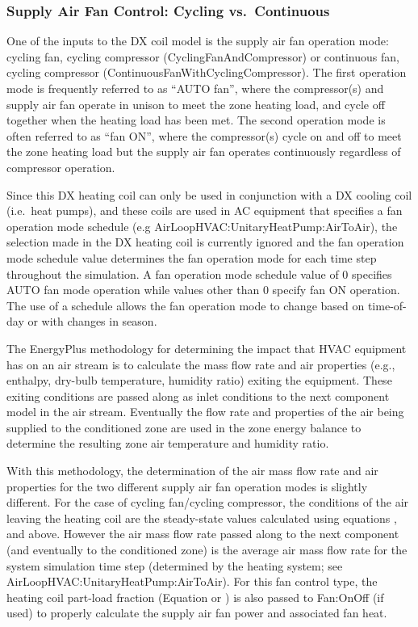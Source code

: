 \subsubsection{Supply Air Fan Control: Cycling vs.~Continuous}\label{supply-air-fan-control-cycling-vs.continuous-1}

One of the inputs to the DX coil model is the supply air fan operation mode: cycling fan, cycling compressor (CyclingFanAndCompressor) or continuous fan, cycling compressor (ContinuousFanWithCyclingCompressor). The first operation mode is frequently referred to as ``AUTO fan'', where the compressor(s) and supply air fan operate in unison to meet the zone heating load, and cycle off together when the heating load has been met. The second operation mode is often referred to as ``fan ON'', where the compressor(s) cycle on and off to meet the zone heating load but the supply air fan operates continuously regardless of compressor operation.

Since this DX heating coil can only be used in conjunction with a DX cooling coil (i.e.~heat pumps), and these coils are used in AC equipment that specifies a fan operation mode schedule (e.g AirLoopHVAC:UnitaryHeatPump:AirToAir), the selection made in the DX heating coil is currently ignored and the fan operation mode schedule value determines the fan operation mode for each time step throughout the simulation. A fan operation mode schedule value of 0 specifies AUTO fan mode operation while values other than 0 specify fan ON operation. The use of a schedule allows the fan operation mode to change based on time-of-day or with changes in season.

The EnergyPlus methodology for determining the impact that HVAC equipment has on an air stream is to calculate the mass flow rate and air properties (e.g., enthalpy, dry-bulb temperature, humidity ratio) exiting the equipment. These exiting conditions are passed along as inlet conditions to the next component model in the air stream. Eventually the flow rate and properties of the air being supplied to the conditioned zone are used in the zone energy balance to determine the resulting zone air temperature and humidity ratio.

With this methodology, the determination of the air mass flow rate and air properties for the two different supply air fan operation modes is slightly different. For the case of cycling fan/cycling compressor, the conditions of the air leaving the heating coil are the steady-state values calculated using equations , and above. However the air mass flow rate passed along to the next component (and eventually to the conditioned zone) is the average air mass flow rate for the system simulation time step (determined by the heating system; see AirLoopHVAC:UnitaryHeatPump:AirToAir). For this fan control type, the heating coil part-load fraction (Equation or ) is also passed to Fan:OnOff (if used) to properly calculate the supply air fan power and associated fan heat.

